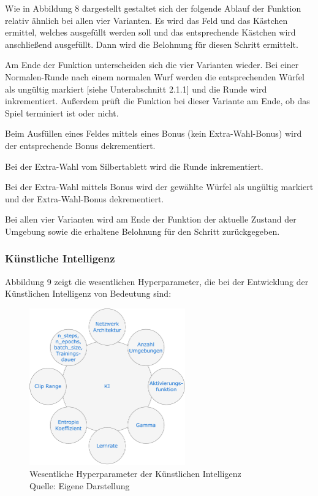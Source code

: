 Wie in Abbildung 8 dargestellt gestaltet sich der folgende Ablauf der Funktion relativ ähnlich bei allen vier Varianten. Es wird das Feld und das Kästchen ermittel, welches ausgefüllt werden soll und das entsprechende Kästchen wird anschließend ausgefüllt. Dann wird die Belohnung für diesen Schritt ermittelt.

Am Ende der Funktion unterscheiden sich die vier Varianten wieder. Bei einer Normalen-Runde nach einem normalen Wurf werden die entsprechenden Würfel als ungültig markiert [siehe Unterabschnitt 2.1.1] und die Runde wird inkrementiert. Außerdem prüft die Funktion bei dieser Variante am Ende, ob das Spiel terminiert ist oder nicht.

Beim Ausfüllen eines Feldes mittels eines Bonus (kein Extra-Wahl-Bonus) wird der entsprechende Bonus dekrementiert.

Bei der Extra-Wahl vom Silbertablett wird die Runde inkrementiert.

Bei der Extra-Wahl mittels Bonus wird der gewählte Würfel als ungültig markiert und der Extra-Wahl-Bonus dekrementiert.

Bei allen vier Varianten wird am Ende der Funktion der aktuelle Zustand der Umgebung sowie die erhaltene Belohnung für den Schritt zurückgegeben.

\subsubsection{Künstliche Intelligenz}
Abbildung 9 zeigt die wesentlichen Hyperparameter, die bei der Entwicklung der Künstlichen Intelligenz von Bedeutung sind:
\nopagebreak
\begin{figure}[H]
	\centering
	\includegraphics[width=0.6\textwidth]{Bilder/KI} 
	\caption[Wesentliche Hyperparameter der Künstlichen Intelligenz]{Wesentliche Hyperparameter der Künstlichen Intelligenz\\ Quelle: Eigene Darstellung}
\end{figure}

